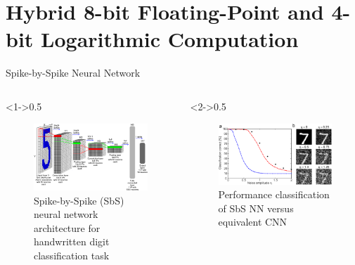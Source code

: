 \section{Hybrid 8-bit Floating-Point and 4-bit Logarithmic Computation}
\tableofcontents[currentsection]
\begin{frame}{Spike-by-Spike Neural Network}
	\begin{columns}[c] %
		
		\begin{column}<1->{0.5\textwidth}
			\begin{figure}
				\includegraphics[width=\textwidth]{../chapters/sbs_accelerator/figures/sbs_network.pdf} %
				\caption{Spike-by-Spike (SbS) neural network architecture for handwritten digit classification task}
			\end{figure}
		\end{column}
		
		\begin{column}<2->{0.5\textwidth}
			\begin{figure}
				\includegraphics[width=\textwidth]{../chapters/sbs_accelerator/figures/sbs_robustnes.pdf} %
				\caption{Performance classification of SbS NN versus equivalent CNN}
			\end{figure}
		\end{column}
		
	\end{columns}
\end{frame}


